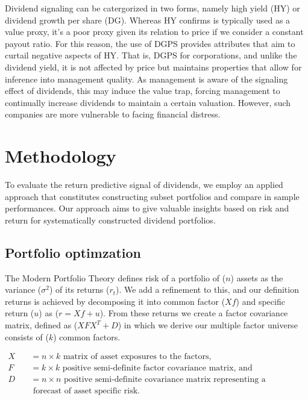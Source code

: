 \documentclass[12pt,preprint, authoryear]{elsarticle}
\numberwithin{equation}{section}
\numberwithin{figure}{section}
\numberwithin{table}{section}
\begin{document}
Dividend signaling can be catergorized in two forms, namely high yield
(HY) or dividend growth per share (DG). Whereas HY confirms is typically
used as a value proxy, it's a poor proxy given its relation to price if
we consider a constant payout ratio. For this reason, the use of DGPS
provides attributes that aim to curtail negative aspects of HY. That is,
DGPS for corporations, and unlike the dividend yield, it is not affected
by price but maintains properties that allow for inference into
management quality. As management is aware of the signaling effect of
dividends, this may induce the value trap, forcing management to
continually increase dividends to maintain a certain valuation. However,
such companies are more vulnerable to facing financial distress.

\newpage

\hypertarget{methodology}{%
\section{Methodology}\label{methodology}}

To evaluate the return predictive signal of dividends, we employ an
applied approach that constitutes constructing subset portfolios and
compare in sample performances. Our approach aims to give valuable
insights based on risk and return for systematically constructed
dividend portfolios.

\hypertarget{portfolio-optimzation}{%
\subsection{Portfolio optimzation}\label{portfolio-optimzation}}

The Modern Portfolio Theory defines risk of a portfolio of (\(n\))
assets as the variance (\(\sigma^2\)) of its returns (\(r_{t}\)). We add
a refinement to this, and our definition returns is achieved by
decomposing it into common factor (\(Xf\)) and specific return (\(u\))
as (\(r = Xf+ u\)). From these returns we create a factor covariance
matrix, defined as (\(X F X^T+D\)) in which we derive our multiple
factor universe consists of (\(k\)) common factors.

\(\begin{array} {ll}X & =n \times k \text { matrix of asset exposures to the factors, } \\ F \quad &= k \times k \text { positive semi-definite factor covariance matrix, and } \\ D \quad &=n \times n \text { positive semi-definite covariance matrix representing a } \\ & \text { forecast of asset specific risk. }\end{array}\)
\end{document}
